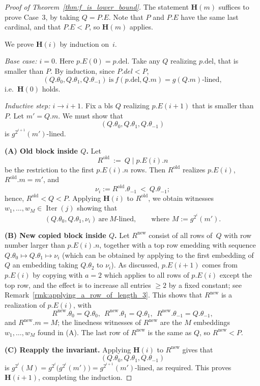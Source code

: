 \documentclass{article}
\theoremstyle{definition}
\theoremstyle{remark}
\DeclareMathOperator{\Iter}{Iter}
\begin{document}
\begin{proof}[Proof of Theorem~\ref{thm:f_is_lower_bound}]
    The statement $\mathbf{H}(m)$ suffices to prove Case~3, by taking $Q= P.E$. Note that $P$ and $P.E$ have the same last cardinal, and that $P.E<P$, so $\mathbf{H}(m)$ applies. 

    \smallskip

    We prove $\mathbf{H}(i)$ by induction on~$i$. 

    \smallskip

    \emph{Base case: $i=0$.}
    Here $p.E(0)=p.\mathrm{del}$. Take any $Q$ realizing $p.\mathrm{del}$, that is smaller than $P$. By induction, since $P.del<P$, 
    \[
    (Q.\theta_0,Q.\theta_1,Q.\theta_{-1})\ \text{is}\ f(p.\mathrm{del},Q.m)=g(Q.m)\text{-lined},
    \]
    i.e.\ $\mathbf{H}(0)$ holds.

    \smallskip

    \emph{Inductive step: $i\to i+1$.}
    Fix a bls $Q$ realizing $p.E(i+1)$ that is smaller than~$P$. Let $m' = Q.m$. We must show that
    \[
    (Q.\theta_0,Q.\theta_1,Q.\theta_{-1})
    \]
    is $g^{2^{i+1}}(m')$-lined.

    \textbf{(A) Old block inside $Q$.}
    Let
    \[
    R^{\mathrm{old}}\ :=\ Q\!\mid p.E(i).n
    \]
    be the restriction to the first $p.E(i).n$ rows. Then $R^{\mathrm{old}}$ realizes $p.E(i)$, $R^{\mathrm{old}}.m=m'$, and
    \[
    \nu_i:=R^{\mathrm{old}}.\theta_{-1}\ <\ Q.\theta_{-1};
    \]
    hence, $R^{\mathrm{old}}< Q < P$. 
    Applying $\mathbf{H}(i)$ to $R^{\mathrm{old}}$, we obtain witnesses $w_1,\dots,w_M\in\Iter(j)$ showing that
    \[
    (Q.\theta_0,Q.\theta_1,\nu_i)\ \text{are}\ M\text{-lined},\qquad \text{where }M:=g^{2^i}(m').
    \]

    \textbf{(B) New copied block inside $Q$.}
    Let $R^{\mathrm{new}}$ consist of all rows of~$Q$ with row number larger than $p.E(i).n$, together with a top row emedding with sequence $Q.\theta_0\mapsto Q.\theta_1\mapsto \nu_i$ (which can be obtained by applying to the first embedding of~$Q$ an embedding taking $Q.\theta_2$ to $\nu_i$). As discussed, $p.E(i+1)$ comes from $p.E(i)$ by copying with $a=2$ which applies to all rows of $p.E(i)$ except the top row, and the effect is to increase all entries $\ge 2$ by a fixed constant; see Remark~\ref{rmk:applying_a_row_of_length_3}. 
    This shows that $R^{\mathrm{new}}$ is a realization of $p.E(i)$, with 
    \[
    R^{\mathrm{new}}.\theta_0=Q.\theta_0,\ \ R^{\mathrm{new}}.\theta_1=Q.\theta_1,\ \ 
    R^{\mathrm{new}}.\theta_{-1}=Q.\theta_{-1}, 
    \]
    and $R^{\mathrm{new}}.m=M$; the linedness witnesses of $R^{\mathrm{new}}$ are the $M$ embeddings $w_1,\dots,w_M$ found in (A). The last row of $R^{\mathrm{new}}$ is the same as $Q$, so $R^{\textrm{new}}<P$. 

    \textbf{(C) Reapply the invariant.}
    Applying $\mathbf{H}(i)$ to $R^{\mathrm{new}}$ gives that
    \[
    (Q.\theta_0,Q.\theta_1,Q.\theta_{-1})
    \]
    is $g^{2^i}(M)=g^{2^i}\!\bigl(g^{2^i}(m')\bigr)=g^{2^{i+1}}(m')$-lined, as required.
    This proves $\mathbf{H}(i+1)$, completing the induction. 
\end{proof}
\end{document}
